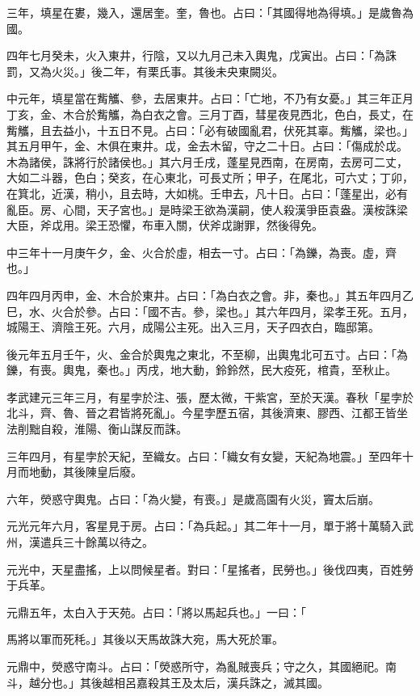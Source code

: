 \begin{pinyinscope}
三年，填星在婁，幾入，還居奎。奎，魯也。占曰：「其國得地為得填。」是歲魯為國。

四年七月癸未，火入東井，行陰，又以九月己未入輿鬼，戊寅出。占曰：「為誅罰，又為火災。」後二年，有栗氏事。其後未央東闕災。

中元年，填星當在觜觿、參，去居東井。占曰：「亡地，不乃有女憂。」其三年正月丁亥，金、木合於觜觿，為白衣之會。三月丁酉，彗星夜見西北，色白，長丈，在觜觿，且去益小，十五日不見。占曰：「必有破國亂君，伏死其辜。觜觿，梁也。」其五月甲午，金、木俱在東井。戉，金去木留，守之二十日。占曰：「傷成於戉。木為諸侯，誅將行於諸侯也。」其六月壬戌，蓬星見西南，在房南，去房可二丈，大如二斗器，色白；癸亥，在心東北，可長丈所；甲子，在尾北，可六丈；丁卯，在箕北，近漢，稍小，且去時，大如桃。壬申去，凡十日。占曰：「蓬星出，必有亂臣。房、心間，天子宮也。」是時梁王欲為漢嗣，使人殺漢爭臣袁盎。漢桉誅梁大臣，斧戉用。梁王恐懼，布車入關，伏斧戉謝罪，然後得免。

中三年十一月庚午夕，金、火合於虛，相去一寸。占曰：「為鑠，為喪。虛，齊也。」

四年四月丙申，金、木合於東井。占曰：「為白衣之會。非，秦也。」其五年四月乙巳，水、火合於參。占曰：「國不吉。參，梁也。」其六年四月，梁孝王死。五月，城陽王、濟陰王死。六月，成陽公主死。出入三月，天子四衣白，臨邸第。

後元年五月壬午，火、金合於輿鬼之東北，不至柳，出輿鬼北可五寸。占曰：「為鑠，有喪。輿鬼，秦也。」丙戌，地大動，鈴鈴然，民大疫死，棺貴，至秋止。

孝武建元三年三月，有星孛於注、張，歷太微，干紫宮，至於天漢。春秋「星孛於北斗，齊、魯、晉之君皆將死亂」。今星孛歷五宿，其後濟東、膠西、江都王皆坐法削黜自殺，淮陽、衡山謀反而誅。

三年四月，有星孛於天紀，至織女。占曰：「織女有女變，天紀為地震。」至四年十月而地動，其後陳皇后廢。

六年，熒惑守輿鬼。占曰：「為火變，有喪。」是歲高園有火災，竇太后崩。

元光元年六月，客星見于房。占曰：「為兵起。」其二年十一月，單于將十萬騎入武州，漢遣兵三十餘萬以待之。

元光中，天星盡搖，上以問候星者。對曰：「星搖者，民勞也。」後伐四夷，百姓勞于兵革。

元鼎五年，太白入于天苑。占曰：「將以馬起兵也。」一曰：「

馬將以軍而死秏。」其後以天馬故誅大宛，馬大死於軍。

元鼎中，熒惑守南斗。占曰：「熒惑所守，為亂賊喪兵；守之久，其國絕祀。南斗，越分也。」其後越相呂嘉殺其王及太后，漢兵誅之，滅其國。


\end{pinyinscope}
